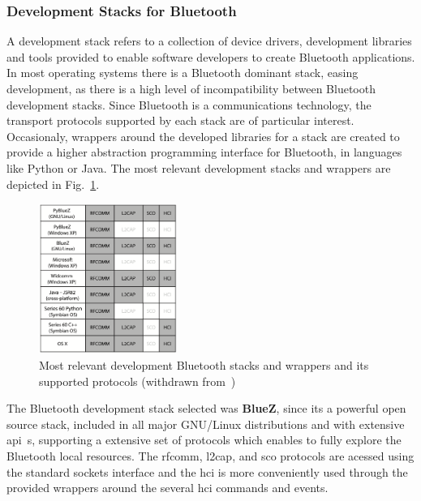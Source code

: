 \subsubsection{Development Stacks for Bluetooth}%
\label{sec:bt-hci}
A development stack refers to a collection of device drivers, development libraries and
tools provided to enable software developers to create Bluetooth
applications. In most operating systems there is a Bluetooth dominant stack,
easing development, as there is a high level of incompatibility between
Bluetooth development stacks. Since Bluetooth is a communications technology,
the transport protocols supported by each stack are of particular
interest. Occasionaly, wrappers around the developed libraries for a stack are
created to provide a higher abstraction programming interface for Bluetooth, in
languages like Python or Java. The most relevant development stacks and wrappers
are depicted in Fig.~\ref{fig:bt-stacks}.
\begin{figure}[!hbt]
\centering
    \includegraphics[width=0.4\textwidth]{./img/bt-stacks.png}
  \caption{Most relevant development Bluetooth stacks and wrappers and its
    supported protocols (withdrawn from~\cite{huang2007bluetooth})}%
\label{fig:bt-stacks}
\end{figure}

The Bluetooth development stack selected was \textbf{BlueZ}, since its a
powerful open source stack, included in all major GNU/Linux distributions and
with extensive \gls{api}~s, supporting a extensive set of protocols which
enables to fully explore the Bluetooth local resources. The \gls{rfcomm},
\gls{l2cap}, and \gls{sco} protocols are acessed using the standard sockets
interface and the \gls{hci} is more conveniently used through the provided
wrappers around the several \gls{hci} commands and events.
%